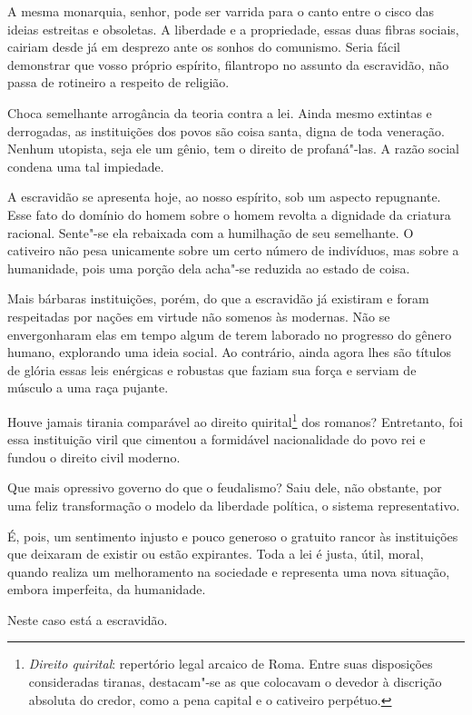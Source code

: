 \begin{linenumbers}
A mesma monarquia, senhor, pode ser varrida para o canto entre o cisco
das ideias estreitas e obsoletas. A liberdade e a propriedade, essas
duas fibras sociais, cairiam desde já em desprezo ante os sonhos do
comunismo. Seria fácil demonstrar que vosso próprio espírito,
filantropo no assunto da escravidão, não passa de rotineiro a respeito de religião.

Choca semelhante arrogância da teoria contra a lei. Ainda mesmo extintas
e derrogadas, as instituições dos povos são coisa santa, digna de toda
veneração. Nenhum utopista, seja ele um gênio, tem o direito de
profaná"-las. A razão social condena uma tal impiedade. 

A escravidão se apresenta hoje, ao nosso espírito, sob um aspecto
repugnante. Esse fato do domínio do homem sobre o homem revolta a
dignidade da criatura racional. Sente"-se ela rebaixada com a
humilhação de seu semelhante. O cativeiro não pesa unicamente sobre um
certo número de indivíduos, mas sobre a humanidade, pois uma porção
dela acha"-se reduzida ao estado de coisa.

Mais bárbaras instituições, porém, do que a escravidão já existiram e
foram respeitadas por nações em virtude não somenos às modernas. Não se
envergonharam elas em tempo algum de terem laborado no progresso do
gênero humano, explorando uma ideia social. Ao contrário, ainda agora
lhes são títulos de glória essas leis enérgicas e robustas que faziam
sua força e serviam de músculo a uma raça pujante. 

Houve jamais tirania comparável ao direito
quirital\footnote{ \textit{Direito quirital}: repertório legal arcaico de Roma. 
Entre suas disposições consideradas tiranas, destacam"-se as que colocavam 
o devedor à discrição absoluta do credor, como a pena capital e o cativeiro perpétuo.} 
dos romanos? Entretanto, foi essa instituição viril que cimentou a
formidável nacionalidade do povo rei e fundou o direito civil moderno. 

Que mais opressivo governo do que o feudalismo? Saiu dele, não obstante,
por uma feliz transformação o modelo da liberdade política, o sistema
representativo. 

É, pois, um sentimento injusto e pouco generoso o gratuito rancor às
instituições que deixaram de existir ou estão expirantes. Toda a lei é
justa, útil, moral, quando realiza um melhoramento na sociedade e
representa uma nova situação, embora imperfeita, da humanidade. 

Neste caso está a escravidão.


\end{linenumbers}
